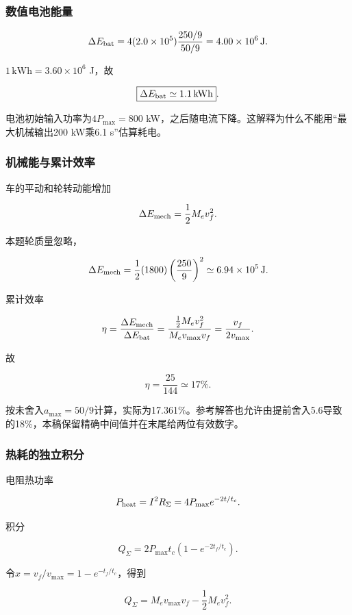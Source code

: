 \documentclass[12pt,a4paper,fontset=fandol]{ctexart}
\begin{document}
\subsubsection{数值电池能量}\label{ux6570ux503cux7535ux6c60ux80fdux91cf}

\[
\Delta E_{\rm bat}
=4(2.0\times10^5)\frac{250/9}{50/9}
=4.00\times10^6\,\mathrm J.
\]

\(1\,\mathrm{kWh}=3.60\times10^6\) J，故

\[
\boxed{\Delta E_{\rm bat}\simeq1.1\,\mathrm{kWh}}.
\]

电池初始输入功率为\(4P_{\max}=800\)
kW，之后随电流下降。这解释为什么不能用``最大机械输出200 kW乘6.1
s''估算耗电。

\subsubsection{机械能与累计效率}\label{ux673aux68b0ux80fdux4e0eux7d2fux8ba1ux6548ux7387}

车的平动和轮转动能增加

\[
\Delta E_{\rm mech}=\frac12M_ev_f^2.
\]

本题轮质量忽略，

\[
\Delta E_{\rm mech}
=\frac12(1800)\left(\frac{250}{9}\right)^2
\simeq6.94\times10^5\,\mathrm J.
\]

累计效率

\[
\eta=\frac{\Delta E_{\rm mech}}{\Delta E_{\rm bat}}
=\frac{\tfrac12M_ev_f^2}{M_ev_{\max}v_f}
=\frac{v_f}{2v_{\max}}.
\]

故

\[
\boxed{\eta=\frac{25}{144}\simeq17\%}.
\]

按未舍入\(a_{\max}=50/9\)计算，实际为17.361\%。参考解答也允许由提前舍入5.6导致的18\%，本稿保留精确中间值并在末尾给两位有效数字。

\subsubsection{热耗的独立积分}\label{ux70edux8017ux7684ux72ecux7acbux79efux5206}

电阻热功率

\[
P_{\rm heat}=I^2R_\Sigma
=4P_{\max}e^{-2t/t_c}.
\]

积分

\[
Q_\Sigma=2P_{\max}t_c(1-e^{-2t_f/t_c}).
\]

令\(x=v_f/v_{\max}=1-e^{-t_f/t_c}\)，得到

\[
Q_\Sigma=M_ev_{\max}v_f-\frac12M_ev_f^2.
\]
\end{document}
